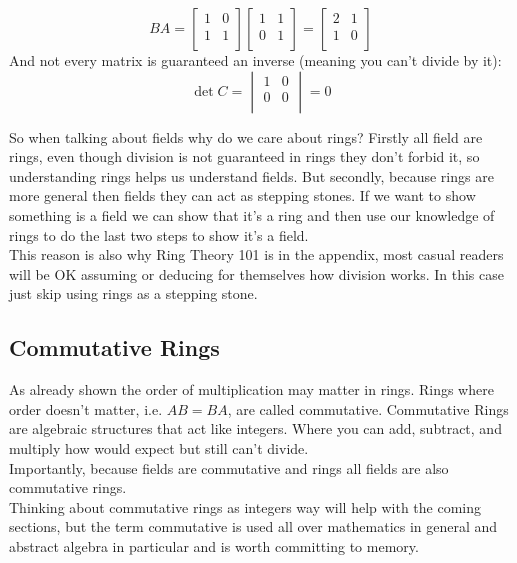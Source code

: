 \[
BA =
\begin{bmatrix}
	1&0\\
	1&1\\
\end{bmatrix}
\begin{bmatrix}
	1&1\\
	0&1\\
\end{bmatrix}
=
\begin{bmatrix}
	2&1\\
	1&0\\
\end{bmatrix}
\]
And not every matrix is guaranteed an inverse (meaning you can't divide by it):
\[
\det C = \begin{vmatrix}
	1&0\\
	0&0\\
\end{vmatrix} = 0
\]

So when talking about fields why do we care about rings?
Firstly all field are rings,
even though division is not guaranteed in rings they don't forbid it,
so understanding rings helps us understand fields.
But secondly,
because rings are more general then fields they can act as stepping stones.
If we want to show something is a field we can show that it's a ring and then use our knowledge of rings to do the last two steps to show it's a field.
\\

This reason is also why Ring Theory 101 is in the appendix, 
most casual readers will be OK assuming or deducing for themselves how division works.
In this case just skip using rings as a stepping stone.

\subsection{Commutative Rings}
As already shown the order of multiplication may matter in rings.
Rings where order doesn't matter,
i.e. $AB = BA$,
are called commutative.
Commutative Rings are algebraic structures that act like integers.
Where you can add, subtract, and multiply how would expect but still can't divide.
\\

Importantly, because fields are commutative and rings all fields are also commutative rings.
\\

Thinking about commutative rings as integers way will help with the coming sections, 
but the term commutative is used all over mathematics in general and abstract algebra in particular and is worth committing to memory.

